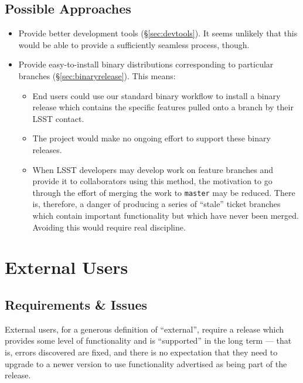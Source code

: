 \documentclass[DM,toc]{lsstdoc}
\begin{document}
\subsection{Possible Approaches}

\begin{itemize}

  \item{Provide better development tools (\S\ref{sec:devtools}). It seems
  unlikely that this would be able to provide a sufficiently seamless process,
  though.}

  \item{Provide easy-to-install binary distributions corresponding to
  particular branches (\S\ref{sec:binaryrelease}). This means:

    \begin{itemize}

      \item{End users could use our standard binary workflow to install a
      binary release which contains the specific features pulled onto a branch
      by their LSST contact.}

      \item{The project would make no ongoing effort to support these binary
      releases.}

      \item{When LSST developers may develop work on feature branches and
      provide it to collaborators using this method, the motivation to go
      through the effort of merging the work to \texttt{master} may be
      reduced. There is, therefore, a danger of producing a series of
      ``stale'' ticket branches which contain important functionality but
      which have never been merged. Avoiding this would require real
      discipline.}

    \end{itemize}

  }

\end{itemize}

\section{External Users}
\label{sec:externals}

\subsection{Requirements \& Issues}

External users, for a generous definition of ``external'', require a release
which provides some level of functionality and is ``supported'' in the long
term --- that is, errors discovered are fixed, and there is no expectation
that they need to upgrade to a newer version to use functionality advertised
as being part of the release.
\end{document}
